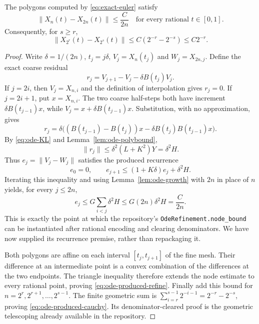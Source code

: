 \begin{theorem}\label{thm:ode-produced-refinement}
The polygons computed by \eqref{eq:exact-euler} satisfy
\begin{equation}\label{eq:ode-produced-refine}
 \lVert X_n(t)-X_{2n}(t)\rVert\le\frac{C}{2n}
 \quad\text{for every rational }t\in[0,1].
\end{equation}
Consequently, for $s\ge r$,
\begin{equation}\label{eq:ode-produced-cauchy}
 \lVert X_{2^r}(t)-X_{2^s}(t)\rVert
 \le C(2^{-r}-2^{-s})\le C2^{-r}.
\end{equation}
\end{theorem}
\begin{proof}
Write $\delta=1/(2n)$, $t_j=j\delta$,
$V_j=X_n(t_j)$ and $W_j=X_{2n,j}$. Define the exact coarse residual
\[
 r_j=V_{j+1}-V_j-\delta B(t_j)V_j.
\]
If $j=2i$, then $V_j=X_{n,i}$ and the definition of interpolation gives
$r_j=0$. If $j=2i+1$, put $x=X_{n,i}$. The two coarse half-steps both have
increment $\delta B(t_{j-1})x$, while
$V_j=x+\delta B(t_{j-1})x$. Substitution, with no approximation, gives
\begin{equation}\label{eq:ode-residual-identity}
 r_j=\delta\bigl((B(t_{j-1})-B(t_j))x
       -\delta B(t_j)B(t_{j-1})x\bigr).
\end{equation}
By \eqref{eq:ode-KL} and Lemma~\ref{lem:ode-polybound},
\[
 \lVert r_j\rVert\le\delta^2(L+K^2)Y=\delta^2H.
\]
Thus $e_j=\lVert V_j-W_j\rVert$ satisfies the produced recurrence
\begin{equation}\label{eq:ode-produced-recurrence}
 e_0=0,\qquad
 e_{j+1}\le(1+K\delta)e_j+\delta^2H.
\end{equation}
Iterating this inequality and using Lemma~\ref{lem:ode-growth} with $2n$
in place of $n$ yields, for every $j\le2n$,
\[
 e_j\le G\sum_{i<j}\delta^2H
 \le G(2n)\delta^2H=\frac{C}{2n}.
\]
This is exactly the point at which the repository's
\texttt{OdeRefinement.node\_bound} can be instantiated after rational
encoding and clearing denominators. We have now supplied its recurrence
premise, rather than repackaging it.

Both polygons are affine on each interval $[t_j,t_{j+1}]$ of the fine
mesh. Their difference at an intermediate point is a convex combination
of the differences at the two endpoints. The triangle inequality therefore
extends the node estimate to every rational point, proving
\eqref{eq:ode-produced-refine}. Finally add this bound for
$n=2^r,2^{r+1},\ldots,2^{s-1}$. The finite geometric sum is
$\sum_{i=r}^{s-1}2^{-i-1}=2^{-r}-2^{-s}$, proving
\eqref{eq:ode-produced-cauchy}. Its denominator-cleared proof is the
geometric telescoping already available in the repository.
\end{proof}

